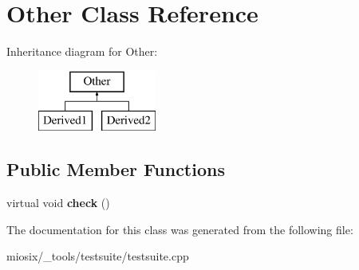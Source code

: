 \hypertarget{class_other}{\section{Other Class Reference}
\label{class_other}
}
Inheritance diagram for Other\-:\begin{figure}[H]
\begin{center}
\leavevmode
\includegraphics[height=2.000000cm]{class_other}
\end{center}
\end{figure}
\subsection*{Public Member Functions}
\begin{DoxyCompactItemize}
\item 
\hypertarget{class_other_ac4ec34192c75e358b2bf8ba3862761ac}{virtual void {\bfseries check} ()}\label{class_other_ac4ec34192c75e358b2bf8ba3862761ac}

\end{DoxyCompactItemize}


The documentation for this class was generated from the following file\-:\begin{DoxyCompactItemize}
\item 
miosix/\-\_\-tools/testsuite/testsuite.\-cpp\end{DoxyCompactItemize}
